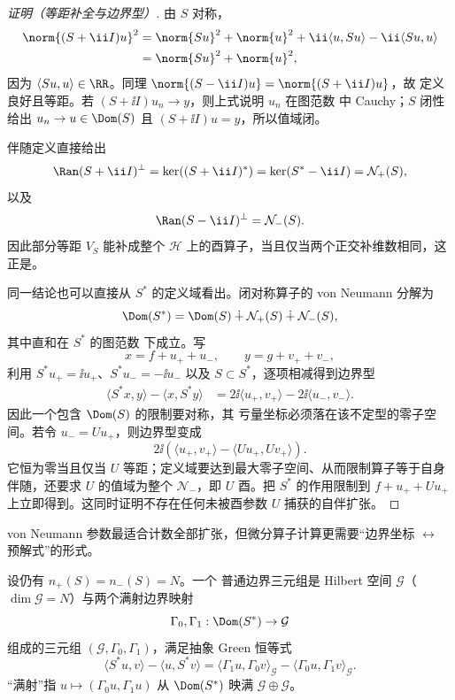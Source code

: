 \begin{proof}[证明（等距补全与边界型）]
由 $S$ 对称，
\[
\begin{aligned}
 \norm{(S+\ii I)u}^2
 &=\norm{Su}^2+\norm{u}^2
   +\ii\langle u,Su\rangle-\ii\langle Su,u\rangle\\
 &=\norm{Su}^2+\norm{u}^2,
\end{aligned}
\]
因为 $\langle Su,u\rangle\in\RR$。同理 $\norm{(S-\ii I)u}=\norm{(S+\ii I)u}$，故 定义良好且等距。若
$(S+\ii I)u_n\to y$，则上式说明 $u_n$ 在图范数 中 Cauchy；$S$ 闭性给出 $u_n\to u\in\Dom(S)$ 且 $(S+\ii I)u=y$，所以值域闭。

伴随定义直接给出
\[
 \Ran(S+\ii I)^\perp
 =\ker((S+\ii I)^*)
 =\ker(S^*-\ii I)=\mathcal N_+(S),
\]
以及
\[
 \Ran(S-\ii I)^\perp=\mathcal N_-(S).
\]
因此部分等距 $V_S$ 能补成整个 $\mathcal H$ 上的酉算子，当且仅当两个正交补维数相同，这正是。

同一结论也可以直接从 $S^*$ 的定义域看出。闭对称算子的 von Neumann 分解为
\begin{equation*}
 \Dom(S^*)=\Dom(S)\mathbin{\dotplus}\mathcal N_+(S)
 \mathbin{\dotplus}\mathcal N_-(S),
\end{equation*}
其中直和在 $S^*$ 的图范数 下成立。写
\[
 x=f+u_++u_-,\qquad y=g+v_++v_-,
\]
利用 $S^*u_+=\ii u_+$、$S^*u_-=-\ii u_-$ 以及 $S\subset S^*$，逐项相减得到边界型
\[
\begin{aligned}
 \langle S^*x,y\rangle-\langle x,S^*y\rangle
 &=2\ii\langle u_+,v_+\rangle
   -2\ii\langle u_-,v_-\rangle.
\end{aligned}
\]
因此一个包含 $\Dom(S)$ 的限制要对称，其 亏量坐标必须落在该不定型的零子空间。若令 $u_-=Uu_+$，则边界型变成
\[
 2\ii\left(\langle u_+,v_+\rangle
 -\langle Uu_+,Uv_+\rangle\right).
\]
它恒为零当且仅当 $U$ 等距；定义域要达到最大零子空间、从而限制算子等于自身伴随，还要求 $U$ 的值域为整个 $\mathcal N_-$，即 $U$ 酉。把 $S^*$ 的作用限制到
$f+u_++Uu_+$ 上立即得到。这同时证明不存在任何未被酉参数 $U$ 捕获的自伴扩张。
\end{proof}

von Neumann 参数最适合计数全部扩张，但微分算子计算更需要“边界坐标 $\leftrightarrow$ 预解式”的形式。

\begin{definition}[普通边界三元组]
设仍有 $n_+(S)=n_-(S)=N$。一个 普通边界三元组是 Hilbert 空间 $\mathcal G$（$\dim\mathcal G=N$）与两个满射边界映射
\[
 \Gamma_0,\Gamma_1:\Dom(S^*)\to\mathcal G
\]
组成的三元组 $(\mathcal G,\Gamma_0,\Gamma_1)$，满足抽象 Green 恒等式
\begin{equation}\label{eq:math-sl-abstract-green-triplet}
 \langle S^*u,v\rangle-\langle u,S^*v\rangle
 =\langle\Gamma_1u,\Gamma_0v\rangle_{\mathcal G}
 -\langle\Gamma_0u,\Gamma_1v\rangle_{\mathcal G}.
\end{equation}
“满射”指 $u\mapsto(\Gamma_0u,\Gamma_1u)$ 从 $\Dom(S^*)$ 映满 $\mathcal G\oplus\mathcal G$。
\end{definition}


